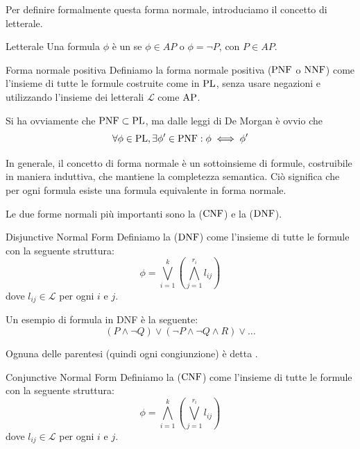 Per definire formalmente questa forma normale, introduciamo il concetto di letterale.

\begin{definition}[namedlabel={def:literal}{Letterale}]{Letterale}
  Una formula \(\phi\) è un  se \(\phi \in AP\) o \(\phi = \neg P \), con \(P \in AP\).
\end{definition}

\begin{definition}{Forma normale positiva}
  Definiamo la forma normale positiva (\(\operatorname{PNF}\) o \(\operatorname{NNF}\)) come l'insieme di tutte le formule costruite come in \(\operatorname{PL}\), senza usare negazioni e utilizzando l'insieme dei letterali \(\mathcal{L}\) come \(\AP\).
\end{definition}

Si ha ovviamente che \(\operatorname{PNF} \subset \operatorname{PL}\), ma dalle leggi di De Morgan è ovvio che
\[\forall \phi \in \operatorname{PL}, \exists \phi' \in \operatorname{PNF}: \phi \iff \phi'\]

In generale, il concetto di forma normale è un sottoinsieme di formule, costruibile in maniera induttiva, che mantiene la completezza semantica.
Ciò significa che per ogni formula esiste una formula equivalente in forma normale.

Le due forme normali più importanti sono la  (\(\operatorname{CNF}\)) e la  (\(\operatorname{DNF}\)).

\begin{definition}{Disjunctive Normal Form}
  Definiamo la  (\(\operatorname{DNF}\)) come l'insieme di tutte le formule con la seguente struttura:
  \[\phi = \bigvee_{i=1}^k\left(\bigwedge_{j=1}^{r_i} l_{ij}\right)\]
  dove \(l_{ij} \in \mathcal{L}\) per ogni \(i\) e \(j\).
\end{definition}

\begin{example}{}
  Un esempio di formula in DNF è la seguente:
  \[(P\land \neg Q) \lor (\neg P \land \neg Q \land R) \lor \ldots\]

  Ognuna delle parentesi (quindi ogni congiunzione) è detta .
\end{example}

\begin{definition}{Conjunctive Normal Form}
  Definiamo la  (\(\operatorname{CNF}\)) come l'insieme di tutte le formule con la seguente struttura:
  \[\phi = \bigwedge_{i=1}^k\left(\bigvee_{j=1}^{r_i} l_{ij}\right)\]
  dove \(l_{ij} \in \mathcal{L}\) per ogni \(i\) e \(j\).
\end{definition}

